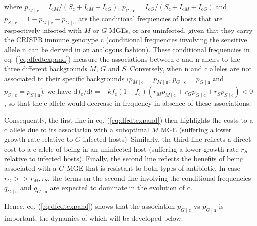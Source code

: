 \documentclass{article}
\newcommand{\badFGE}{M}
\newcommand{\goodFGE}{G}
\newcommand{\sensitive}{\mathrm{n}}
\newcommand{\immune}{\mathrm{c}}
\begin{document}
where $p_{\badFGE\mid \immune} = I_{\immune\badFGE} / \left(S_{\immune} + I_{\immune\badFGE} + I_{\immune\goodFGE} \right )$, $p_{\goodFGE \mid \immune} = I_{\immune\goodFGE} / \left(S_{\immune} + I_{\immune\badFGE} + I_{\immune\goodFGE} \right )$ and $p_{S \mid \immune} = 1 - p_{\badFGE \mid \immune} - p_{\goodFGE \mid \immune}$ are the conditional frequencies of hosts that are respectively infected with $\badFGE$ or $\goodFGE$ MGEs, or are uninfected, given that they carry the CRISPR immune genotype $\immune$ (conditional frequencies involving the sensitive allele $\sensitive$ can be derived in an analogous fashion). These conditional frequencies in eq. (\ref{eq:dfcdtexpand}) measure the associations between $\immune$ and $\sensitive$ alleles to the three different backgrounds $\badFGE$, $\goodFGE$ and $S$. Conversely, when $\sensitive$ and $\immune$ alleles are not associated to their specific backgrounds ($p_{\badFGE\mid \immune} = p_{\badFGE \mid \sensitive}$, $p_{\goodFGE\mid \immune} = p_{\goodFGE\mid \sensitive}$ and  $p_{S \mid \immune} = p_{S \mid \sensitive}$), we have $\mathrm{d} f_{\immune} / \mathrm{d}t  = -k f_{\immune}(1-f_{\immune})(r_{\badFGE}p_{\badFGE\mid \immune} + r_{\goodFGE} p_{\goodFGE\mid \immune} + r_{S} p_{S \mid \immune}) < 0$, so that the $\immune$ allele would decrease in frequency in absence of these associations. 

Consequently, the first line in eq. (\ref{eq:dfcdtexpand}) then highlights the costs to a $\immune$ allele due to its association with a suboptimal $\badFGE$ MGE (suffering a lower growth rate relative to $\goodFGE$-infected hosts). Similarly, the third line reflects a direct cost to a $\immune$ allele of being in an uninfected host (suffering a lower growth rate $r_{S}$ relative to infected hosts). Finally, the second line reflects the benefits of being associated with a $\goodFGE$ MGE that is resistant to both types of antibiotic. In case $r_{\goodFGE}>> r_{\badFGE},r_{S}$, the terms on the second line involving the conditional frequencies $q_{\goodFGE \mid \immune}$ and $q_{\goodFGE \mid \sensitive}$ are expected to dominate in the evolution of $\immune$.

Hence, eq. (\ref{eq:dfcdtexpand}) shows that the association $p_{\goodFGE \mid \immune}$ vs $p_{\goodFGE \mid \sensitive}$ is important, the dynamics of which will be developed below.
\end{document}
